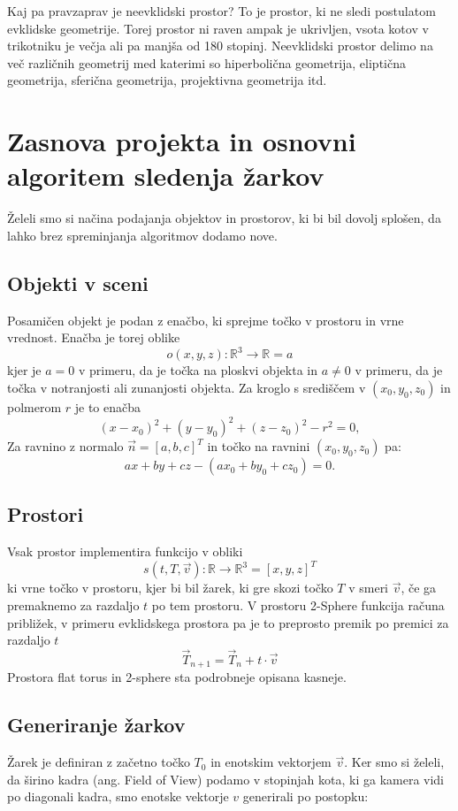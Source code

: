 \documentclass[titlepage]{article}
\begin{document}
Kaj pa pravzaprav je neevklidski prostor? To je prostor, ki ne sledi postulatom evklidske geometrije. 
Torej prostor ni raven ampak je ukrivljen, vsota kotov v trikotniku je večja ali pa manjša od 
180 stopinj. Neevklidski prostor delimo na več različnih geometrij med katerimi so 
hiperbolična geometrija, eliptična geometrija, sferična geometrija, projektivna geometrija itd.

\section{Zasnova projekta in osnovni algoritem sledenja žarkov}
Želeli smo si načina podajanja objektov in prostorov, ki bi bil dovolj splošen, da lahko brez
spreminjanja algoritmov dodamo nove.

\subsection{Objekti v sceni}
Posamičen objekt je podan z enačbo, ki sprejme točko v prostoru in vrne vrednost. 
Enačba je torej oblike
\[ o(x,y,z): \mathbb{R}^3 \to \mathbb{R} = a \]
kjer je \(a = 0\) v primeru, da je točka na ploskvi objekta in \( a \neq 0 \) v primeru, da 
je točka v notranjosti ali zunanjosti objekta.
Za kroglo s središčem v $(x_{0}, y_{0}, z_{0})$ in polmerom $r$ je to enačba
\[(x-x_{0})^{2}+(y-y_{0})^{2}+(z-z_{0})^{2}-r^{2}=0, \]
Za ravnino z normalo \( \vec{n} = [a, b, c]^T \) in točko na ravnini $(x_{0}, y_{0}, z_{0})$ pa:
\[ ax+by+cz-(ax_0+by_0+cz_0) = 0. \]

\subsection{Prostori}
Vsak prostor implementira funkcijo v obliki
\[ s(t, T, \vec{v}): \mathbb{R} \to \mathbb{R}^3 = [x, y, z]^T \]
ki vrne točko v prostoru, kjer bi bil žarek, ki gre skozi točko \(T\) v smeri \(\vec{v}\), če 
ga premaknemo za razdaljo \(t\) po tem prostoru. V prostoru 2-Sphere funkcija računa približek, v primeru evklidskega prostora pa je to 
preprosto premik po premici za razdaljo \(t\)
\[ \vec{T}_{n+1} = \vec{T}_{n} + t \cdot \vec{v} \]
\bigskip
Prostora flat torus in 2-sphere sta podrobneje opisana kasneje.

\subsection{Generiranje žarkov}
Žarek je definiran z začetno točko \(T_{0}\) in enotskim vektorjem \(\vec{v}\). Ker smo si želeli, da 
širino kadra (ang. Field of View) podamo v stopinjah kota, ki ga kamera vidi po diagonali kadra,
smo enotske vektorje \( v \) generirali po postopku:
\end{document}
